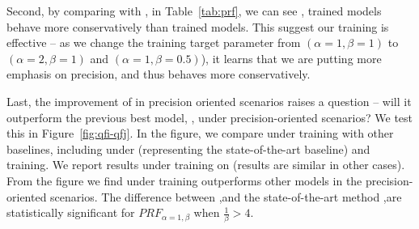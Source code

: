 Second, by comparing  with ,  in Table~\ref{tab:prf}, we can see ,  trained models behave more conservatively than  trained models. This suggest our training is effective -- as we change the training target \PRF parameter from $(\alpha=1,\beta=1)$ to $(\alpha=2,\beta=1)$ and $(\alpha=1,\beta=0.5)$), it learns that we are putting more emphasis on precision, and thus behaves more conservatively.

Last, the improvement of \QFJ in precision oriented scenarios raises a question -- will it outperform the previous best model, \QFI, under precision-oriented scenarios? We test this in Figure~\ref{fig:qfi-qfj}. In the figure, we compare \QFJ under \EUM training with other baselines, including \QFI under \MLE (representing the state-of-the-art baseline) and \EUM training. We report results under  training on \DQF (results are similar in other cases). From the figure we find \QFJ under \EUM training outperforms other models in the precision-oriented scenarios. The difference between \QFJ,\EUM and the state-of-the-art method \QFI,\MLE are statistically significant for $P\!R\!F_{\alpha=1,\beta}$ when $\frac{1}{\beta}>4$.
